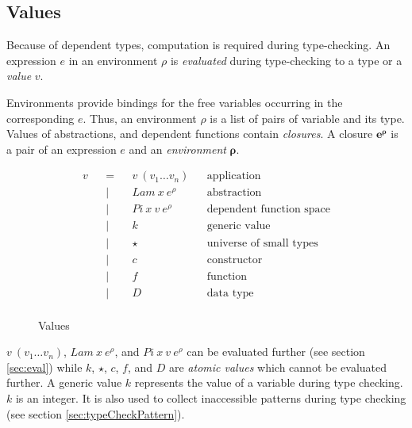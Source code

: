 \documentclass[acmsmall]{acmart}
\begin{document}
\subsection{Values}

Because of dependent types, computation is required during type-checking. An
expression $e$ in an environment $\rho$ is \emph{evaluated} during type-checking to a type or a \emph{value} $v$.

Environments provide bindings for the free variables occurring in the
corresponding $e$. Thus, an environment $\rho$ is a list of pairs of variable and its type. Values of abstractions, and dependent functions contain \emph{closures}. A closure $\boldsymbol{e^{\rho}}$ is a pair of an expression $e$ and an
\emph{environment} $\boldsymbol{\rho}$.

\begin{figure}[H]
  \begin{equation*}
    \label{eq:values}
    \begin{aligned}
      v &  & = &  & v \: (v_1 \dots v_n)     &  & \textrm{application}              \\
        &  & | &  & Lam \: x \: e^{\rho}     &  & \textrm{abstraction}              \\
        &  & | &  & Pi \: x \: v \: e^{\rho} &  & \textrm{dependent function space} \\
        &  & | &  & k                        &  & \textrm{generic value}            \\
        &  & | &  & \star                    &  & \textrm{universe of small types}  \\
        &  & | &  & c                        &  & \textrm{constructor}              \\
        &  & | &  & f                        &  & \textrm{function}                 \\
        &  & | &  & D                        &  & \textrm{data type}                \\
    \end{aligned}
  \end{equation*}
  \caption{Values}
\end{figure}

$v \: (v_1 \dots v_n)$, $Lam \: x \: e^{\rho}$, and $Pi \: x \: v \: e^{\rho}$
can be evaluated further (see section \ref{sec:eval}) while $k$, $\star$, $c$, $f$, and $D$ are \emph{atomic values}
which cannot be evaluated further. A generic value $k$ represents the value of a variable during type
checking. $k$ is an integer. It is also used to collect inaccessible patterns during type checking (see section \ref{sec:typeCheckPattern}). 
\end{document}
